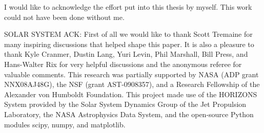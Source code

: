 %
I would like to acknowledge the effort put into this thesis by
myself. This work could not have been done without me.


SOLAR SYSTEM ACK: First of all we would like to thank Scott Tremaine
for many inspiring discussions that helped shape this paper. It is
also a pleasure to thank Kyle Cranmer, Dustin Lang, Yuri Levin, Phil
Marshall, Bill Press, and Hans-Walter Rix for very helpful discussions
and the anonymous referee for valuable comments. This research was
partially supported by NASA (ADP grant NNX08AJ48G), the NSF (grant
AST-0908357), and a Research Fellowship of the Alexander von Humboldt
Foundation. This project made use of the HORIZONS System provided by
the Solar System Dynamics Group of the Jet Propulsion Laboratory, the
NASA Astrophysics Data System, and the open-source Python modules
scipy, numpy, and matplotlib.

